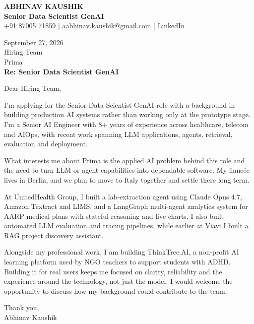 \documentclass[10pt,a4paper]{article}
\begin{document}
\begin{center}
{\Large\bfseries ABHINAV KAUSHIK}\\[2pt]
{\bfseries Senior Data Scientist GenAI}\\[2pt]
+91 87005 71859 \quad | \quad aabhinav.kaushik@gmail.com \quad | \quad LinkedIn
\end{center}
\vspace{8pt}
September 27, 2026\\[6pt]
Hiring Team\\
Prima\\[4pt]
\textbf{Re: Senior Data Scientist GenAI}

Dear Hiring Team,

I’m applying for the Senior Data Scientist GenAI role with a background in building production AI systems rather than working only at the prototype stage. I’m a Senior AI Engineer with 8+ years of experience across healthcare, telecom and AIOps, with recent work spanning LLM applications, agents, retrieval, evaluation and deployment.

What interests me about Prima is the applied AI problem behind this role and the need to turn LLM or agent capabilities into dependable software. My fiancée lives in Berlin, and we plan to move to Italy together and settle there long term.

At UnitedHealth Group, I built a lab-extraction agent using Claude Opus 4.7, Amazon Textract and LIMS, and a LangGraph multi-agent analytics system for AARP medical plans with stateful reasoning and live charts. I also built automated LLM evaluation and tracing pipelines, while earlier at Viavi I built a RAG project discovery assistant.

Alongside my professional work, I am building ThinkTree.AI, a non-profit AI learning platform used by NGO teachers to support students with ADHD. Building it for real users keeps me focused on clarity, reliability and the experience around the technology, not just the model. I would welcome the opportunity to discuss how my background could contribute to the team.

Thank you,\\
Abhinav Kaushik
\end{document}
